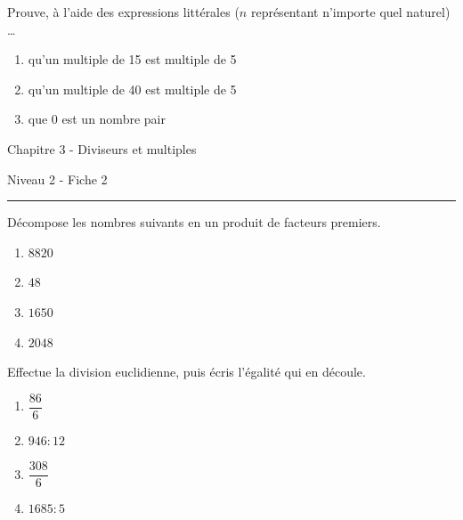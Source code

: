 \documentclass[12pt,parskip=half-, twoside=semi]{scrartcl}
\begin{document}
      \begin{exercise}
          Prouve, à l'aide des expressions littérales (\(n\) représentant n'importe quel naturel) \dots 
          \begin{enumerate}
            \item qu'un multiple de 15 est multiple de 5
            \item qu'un multiple de 40 est multiple de 5 
            \item que 0 est un nombre pair
          \end{enumerate}
        \end{exercise}

\newpage

  \begin{center}
    \bfseries
    \begin{Huge}
      Chapitre 3 - Diviseurs et multiples
    \end{Huge}
    \smallbreak
    \begin{large}
      Niveau 2  - Fiche 2
    \end{large}
    \smallbreak
    \rule[10pt]{.5\linewidth}{1 pt}
  \end{center}
  
  \setcounter{exercise}{0}
        
        \begin{exercise}
          Décompose les nombres suivants en un produit de facteurs premiers.
            \begin{enumerate}[cols=2]
              \item $8820$
              \item $48$
              \item $1650$
              \item $2048$
            \end{enumerate}
        \end{exercise}
        
        \begin{exercise}
          Effectue la division euclidienne, puis écris l'égalité qui en découle. 
            \begin{enumerate}[cols=2]
              \item $\dfrac{86}{6}$
              \item $946 : 12$
              \item $\dfrac{308}{6}$
              \item $1685 : 5$
            \end{enumerate}
        \end{exercise}
 
\end{document}
